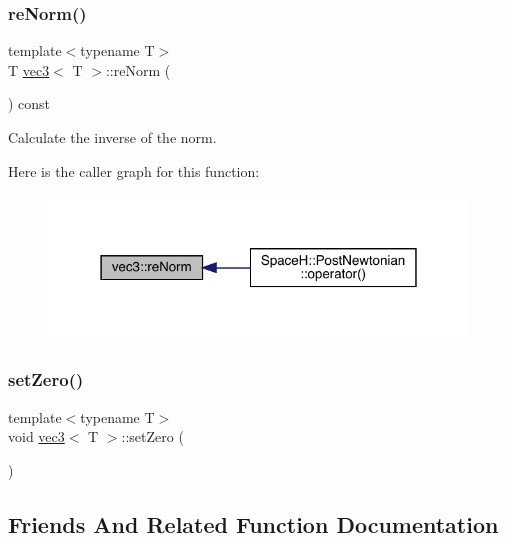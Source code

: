 \subsubsection{\texorpdfstring{re\+Norm()}{reNorm()}}
{\footnotesize\ttfamily template$<$typename T$>$ \\
T \mbox{\hyperlink{structvec3}{vec3}}$<$ T $>$\+::re\+Norm (\begin{DoxyParamCaption}{ }\end{DoxyParamCaption}) const\hspace{0.3cm}{\ttfamily [inline]}}



Calculate the inverse of the norm. 

Here is the caller graph for this function\+:
\nopagebreak
\begin{figure}[H]
\begin{center}
\leavevmode
\includegraphics[width=316pt]{structvec3_a8539e3e4fbf555f6bd464fdc75fdfd56_icgraph}
\end{center}
\end{figure}
\mbox{\label{structvec3_a4bfe30989d83b8f3b5b3d2177f804360}} 
\subsubsection{\texorpdfstring{set\+Zero()}{setZero()}}
{\footnotesize\ttfamily template$<$typename T$>$ \\
void \mbox{\hyperlink{structvec3}{vec3}}$<$ T $>$\+::set\+Zero (\begin{DoxyParamCaption}{ }\end{DoxyParamCaption})\hspace{0.3cm}{\ttfamily [inline]}}



\subsection{Friends And Related Function Documentation}
\mbox{\label{structvec3_a4f0b2685679a321b6c43a7406719c3a5}} 
